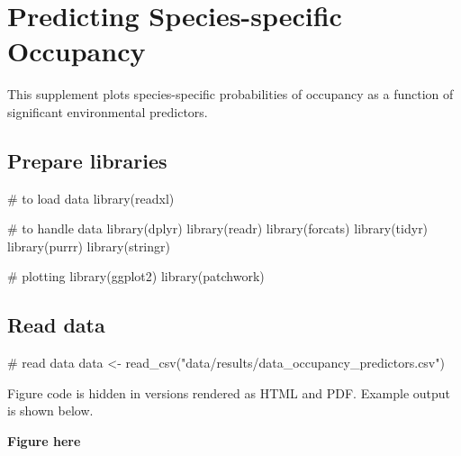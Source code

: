 \documentclass[]{article}
\newenvironment{Shaded}{}{}
\newcommand{\CommentTok}[1]{\textcolor[rgb]{0.00,0.50,0.00}{#1}}
\newcommand{\DataTypeTok}[1]{#1}
\newcommand{\KeywordTok}[1]{\textcolor[rgb]{0.00,0.00,1.00}{#1}}
\newcommand{\NormalTok}[1]{#1}
\newcommand{\OperatorTok}[1]{#1}
\newcommand{\StringTok}[1]{\textcolor[rgb]{0.00,0.50,0.50}{#1}}
\begin{document}
\hypertarget{predicting-species-specific-occupancy}{%
\section{Predicting Species-specific Occupancy}\label{predicting-species-specific-occupancy}}

This supplement plots species-specific probabilities of occupancy as a function of significant environmental predictors.

\hypertarget{prepare-libraries-4}{%
\subsection{Prepare libraries}\label{prepare-libraries-4}}

\begin{Shaded}
\begin{Highlighting}[numbers=left,,]
\CommentTok{# to load data}
\KeywordTok{library}\NormalTok{(readxl)}

\CommentTok{# to handle data}
\KeywordTok{library}\NormalTok{(dplyr)}
\KeywordTok{library}\NormalTok{(readr)}
\KeywordTok{library}\NormalTok{(forcats)}
\KeywordTok{library}\NormalTok{(tidyr)}
\KeywordTok{library}\NormalTok{(purrr)}
\KeywordTok{library}\NormalTok{(stringr)}

\CommentTok{# plotting}
\KeywordTok{library}\NormalTok{(ggplot2)}
\KeywordTok{library}\NormalTok{(patchwork)}
\end{Highlighting}
\end{Shaded}

\hypertarget{read-data}{%
\subsection{Read data}\label{read-data}}

\begin{Shaded}
\begin{Highlighting}[numbers=left,,]
\CommentTok{# read data}
\NormalTok{data <-}\StringTok{ }\KeywordTok{read_csv}\NormalTok{(}\StringTok{"data/results/data_occupancy_predictors.csv"}\NormalTok{)}
\end{Highlighting}
\end{Shaded}

\begin{Shaded}
\end{Shaded}

Figure code is hidden in versions rendered as HTML and PDF.
Example output is shown below.

\textbf{Figure here}
\end{document}
